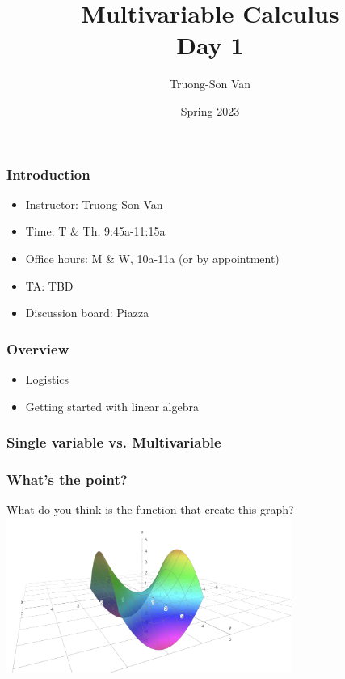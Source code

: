 \documentclass[aspectratio=169]{beamer}
\title{ Multivariable Calculus \\ Day 1}
\institute{Fulbright University Vietnam}
\author{Truong-Son Van}
\date{Spring 2023}
\begin{document}
\maketitle


\begin{frame}
    \frametitle{Introduction}
    \begin{itemize}
        \item Instructor: Truong-Son Van
        \item Time: T \& Th, 9:45a-11:15a
        \item Office hours: M \& W, 10a-11a (or by appointment)
        \item TA: TBD
        \item Discussion board: Piazza
    \end{itemize}
\end{frame}

\begin{frame}
    \frametitle{Overview}
    \begin{itemize}
        \item Logistics
        \item Getting started with linear algebra
    \end{itemize}
\end{frame}

\begin{frame}
    \frametitle{Single variable vs. Multivariable}

\end{frame}

\begin{frame}
    \frametitle{What's the point?}
    What do you think is the function that create this graph?
    \centering
    \includegraphics[width=0.7\textwidth]{saddle}
\end{frame}
\end{document}
